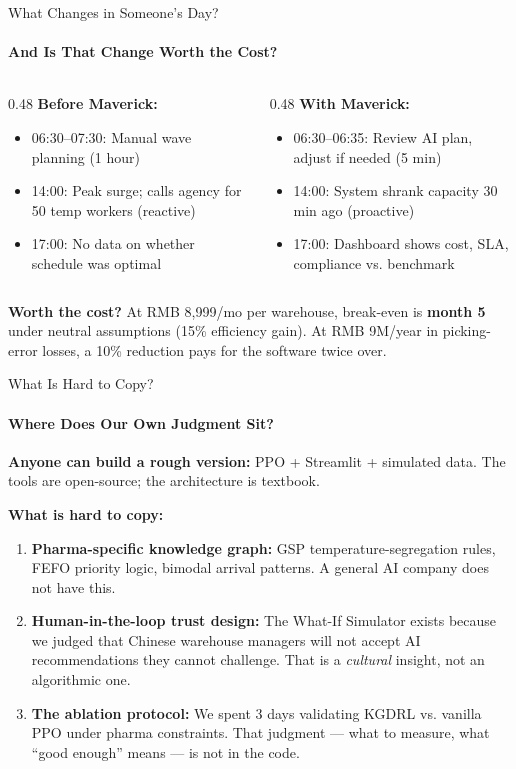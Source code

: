 \documentclass{beamer}
\begin{document}
\begin{frame}{What Changes in Someone's Day?}
  \framesubtitle{And Is That Change Worth the Cost?}
  \small

  \begin{columns}
    \begin{column}{0.48\textwidth}
      \textbf{Before Maverick:}
      \begin{itemize}
        \item 06:30--07:30: Manual wave planning (1 hour)
        \item 14:00: Peak surge; calls agency for 50 temp workers (reactive)
        \item 17:00: No data on whether schedule was optimal
      \end{itemize}
    \end{column}
    \begin{column}{0.48\textwidth}
      \textbf{With Maverick:}
      \begin{itemize}
        \item 06:30--06:35: Review AI plan, adjust if needed (5 min)
        \item 14:00: System shrank capacity 30 min ago (proactive)
        \item 17:00: Dashboard shows cost, SLA, compliance vs. benchmark
      \end{itemize}
    \end{column}
  \end{columns}

  \vspace{0.25cm}
  \textbf{Worth the cost?} At RMB 8,999/mo per warehouse, break-even is \textbf{month 5} under neutral assumptions (15\% efficiency gain). At RMB 9M/year in picking-error losses, a 10\% reduction pays for the software twice over.
\end{frame}

\begin{frame}{What Is Hard to Copy?}
  \framesubtitle{Where Does Our Own Judgment Sit?}
  \small

  \textbf{Anyone can build a rough version:} PPO + Streamlit + simulated data. The tools are open-source; the architecture is textbook.

  \vspace{0.25cm}
  \textbf{What is hard to copy:}
  \begin{enumerate}
    \item \textbf{Pharma-specific knowledge graph:} GSP temperature-segregation rules, FEFO priority logic, bimodal arrival patterns. A general AI company does not have this.
    \item \textbf{Human-in-the-loop trust design:} The What-If Simulator exists because we judged that Chinese warehouse managers will not accept AI recommendations they cannot challenge. That is a \textit{cultural} insight, not an algorithmic one.
    \item \textbf{The ablation protocol:} We spent 3 days validating KGDRL vs. vanilla PPO under pharma constraints. That judgment --- what to measure, what ``good enough'' means --- is not in the code.
  \end{enumerate}
\end{frame}
\end{document}
